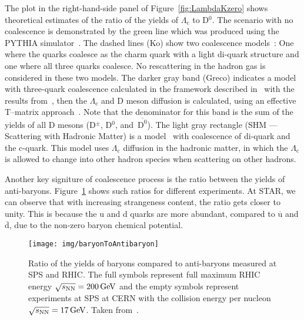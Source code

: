 The plot in the right-hand-side panel of Figure~\ref{fig:LambdaKzero} shows theoretical estimates of the ratio of the yields of $\Lambda_\mathrm{c}$ to D$^0$. The scenario with no coalescence is demonstrated by the green line which was produced using the PYTHIA simulator~\cite{PYTHIA}. The dashed lines (Ko) show two coalescence models~\cite{LcCoalescence_OhKoLeeYasui}: One where the  quarks coalesce as the charm quark with a light di-quark structure and one where all three quarks coalesce. No rescattering in the hadron gas is considered in these two models. The darker gray band (Greco) indicates a model with three-quark coalescence calculated in the framework described in~\cite{Greco_framework} with the results from~\cite{Greco_results}, then the $\Lambda_\mathrm{c}$ and D meson diffusion is calculated, using an effective T--matrix approach~\cite{Ghosh_Lc_rescattering}. Note that the denominator for this band is the sum of the yields of all D mesons (D$^\pm$, D$^0$, and~$\mathrm{\overline{D^0}}$). The light gray rectangle (SHM --- Scattering with Hadronic Matter) is a model~\cite{SHM} with coalescence of di-quark and the c-quark. This model uses $\Lambda_\mathrm{c}$ diffusion in the hadronic matter, in which the $\Lambda_\mathrm{c}$ is allowed to change into other hadron species when scattering on other hadrons.

Another key signiture of coalescence process is the ratio between the yields of anti-baryons. Figure~\ref{fig:BtoAntiB} shows such ratios for different experiments. At STAR, we can observe that with increasing strangeness content, the ratio gets closer to unity. This is because the u and d quarks are more abundant, compared to $\overline{\mathrm{u}}$ and $\overline{\mathrm{d}}$, due to the non-zero baryon chemical potential. 

\begin{figure}
\centering
\texttt{[image: img/baryonToAntibaryon]}
\caption{Ratio of the yields of baryons compared to anti-baryons measured at SPS and RHIC\@. The full symbols represent full maximum RHIC energy $\sqrt{s_\text{NN}} = \SI{200}{GeV}$ and the empty symbols represent experiments at SPS at CERN with the collision energy per nucleon $\sqrt{s_\text{NN}} = \SI{17}{GeV}$. Taken from~\cite{BtoAntiB}.}
\label{fig:BtoAntiB}
\end{figure}



